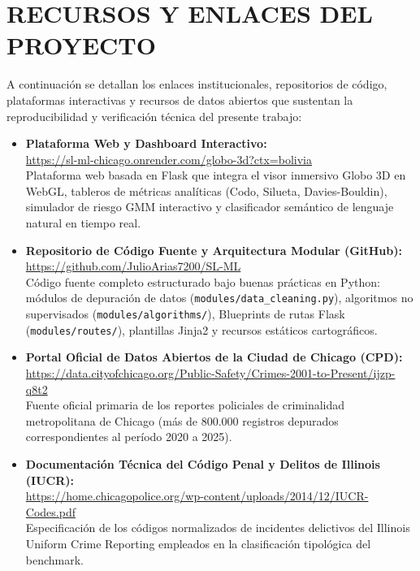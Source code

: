 \section{RECURSOS Y ENLACES DEL PROYECTO}
\label{sec:recursos_enlaces}

A continuación se detallan los enlaces institucionales, repositorios de código, plataformas interactivas y recursos de datos abiertos que sustentan la reproducibilidad y verificación técnica del presente trabajo:

\begin{itemize}
    \item \textbf{Plataforma Web y Dashboard Interactivo:}\\
    \url{https://sl-ml-chicago.onrender.com/globo-3d?ctx=bolivia}\\
    Plataforma web basada en Flask que integra el visor inmersivo Globo 3D en WebGL, tableros de métricas analíticas (Codo, Silueta, Davies-Bouldin), simulador de riesgo GMM interactivo y clasificador semántico de lenguaje natural en tiempo real.
    
    \item \textbf{Repositorio de Código Fuente y Arquitectura Modular (GitHub):}\\
    \url{https://github.com/JulioArias7200/SL-ML}\\
    Código fuente completo estructurado bajo buenas prácticas en Python: módulos de depuración de datos (\texttt{modules/\allowbreak data\_cleaning.py}), algoritmos no supervisados (\texttt{modules/\allowbreak algorithms/}), Blueprints de rutas Flask (\texttt{modules/\allowbreak routes/}), plantillas Jinja2 y recursos estáticos cartográficos.
    
    \item \textbf{Portal Oficial de Datos Abiertos de la Ciudad de Chicago (CPD):}\\
    \url{https://data.cityofchicago.org/Public-Safety/Crimes-2001-to-Present/ijzp-q8t2}\\
    Fuente oficial primaria de los reportes policiales de criminalidad metropolitana de Chicago (más de 800.000 registros depurados correspondientes al período 2020 a 2025).
    
    \item \textbf{Documentación Técnica del Código Penal y Delitos de Illinois (IUCR):}\\
    \url{https://home.chicagopolice.org/wp-content/uploads/2014/12/IUCR-Codes.pdf}\\
    Especificación de los códigos normalizados de incidentes delictivos del Illinois Uniform Crime Reporting empleados en la clasificación tipológica del benchmark.
    

\end{itemize}

